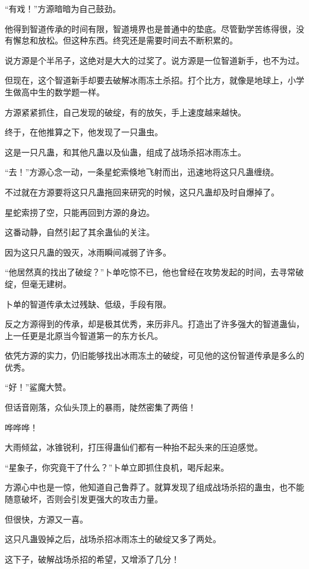 \begin{this_body}
“有戏！”方源暗暗为自己鼓劲。

他得到智道传承的时间有限，智道境界也是普通中的垫底。尽管勤学苦练得很，没有懈怠和放松。但这种东西。终究还是需要时间去不断积累的。

说方源是个半吊子，这绝对是大大的过奖了。说方源是一位智道新手，也不为过。

但现在，这个智道新手却要去破解冰雨冻土杀招。打个比方，就像是地球上，小学生做高中生的数学题一样。

方源紧紧抓住，自己发现的破绽，有的放矢，手上速度越来越快。

终于，在他推算之下，他发现了一只蛊虫。

这是一只凡蛊，和其他凡蛊以及仙蛊，组成了战场杀招冰雨冻土。

“去！”方源心念一动，一条星蛇索倏地飞射而出，迅速地将这只凡蛊缠绕。

不过就在方源要将这只凡蛊拖回来研究的时候，这只凡蛊却及时自爆掉了。

星蛇索捞了空，只能再回到方源的身边。

这番动静，自然引起了其余蛊仙的关注。

因为这只凡蛊的毁灭，冰雨瞬间减弱了许多。

“他居然真的找出了破绽？”卜单吃惊不已，他也曾经在攻势发起的时间，去寻常破绽，但毫无建树。

卜单的智道传承太过残缺、低级，手段有限。

反之方源得到的传承，却是极其优秀，来历非凡。打造出了许多强大的智道蛊仙，上一任更是北原当今智道第一的东方长凡。

依凭方源的实力，仍旧能够找出冰雨冻土的破绽，可见他的这份智道传承是多么的优秀。

“好！”鲨魔大赞。

但话音刚落，众仙头顶上的暴雨，陡然密集了两倍！

哗哗哗！

大雨倾盆，冰锥锐利，打压得蛊仙们都有一种抬不起头来的压迫感觉。

“星象子，你究竟干了什么？”卜单立即抓住良机，喝斥起来。

方源心中也是一惊，他知道自己鲁莽了。就算发现了组成战场杀招的蛊虫，也不能随意破坏，否则会引发更强大的攻击力量。

但很快，方源又一喜。

这只凡蛊毁掉之后，战场杀招冰雨冻土的破绽又多了两处。

这下子，破解战场杀招的希望，又增添了几分！

\end{this_body}


